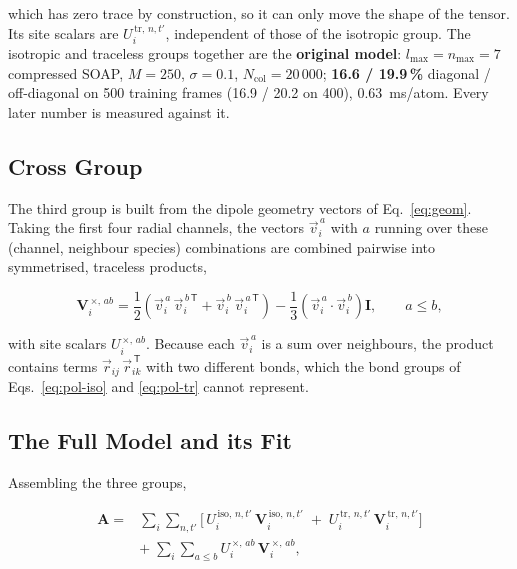 \documentclass[11pt,a4paper]{article}
\begin{document}
which has zero trace by construction, so it can only move the shape of the tensor. Its site
scalars are $U_i^{\,\mathrm{tr},\,n,t'}$, independent of those of the isotropic group. The
isotropic and traceless groups together are the \textbf{original model}:
$l_{\max}=n_{\max}=7$ compressed SOAP, $M=250$, $\sigma=0.1$, $N_{\mathrm{col}} = 20\,000$;
\textbf{16.6 / 19.9\,\%} diagonal / off-diagonal on 500 training frames (16.9 / 20.2 on 400),
0.63~ms/atom. Every later number is measured against it.

\subsection{Cross Group}\label{sec:pol-cross}

The third group is built from the dipole geometry vectors of Eq.~\ref{eq:geom}. Taking the first
four radial channels, the vectors $\vec v_i^{\,a}$ with $a$ running over these (channel,
neighbour species) combinations are combined pairwise into symmetrised, traceless products,

\begin{equation}
\mathbf{V}_i^{\,\times,\,ab} = \frac{1}{2}\left(\vec v_i^{\,a}\,\vec v_i^{\,b\,\mathsf{T}} + \vec v_i^{\,b}\,\vec v_i^{\,a\,\mathsf{T}}\right)
- \frac{1}{3}\left(\vec v_i^{\,a}\cdot\vec v_i^{\,b}\right)\mathbf{I},
\qquad a \le b,
\label{eq:pol-cross}
\end{equation}

with site scalars $U_i^{\,\times,\,ab}$. Because each $\vec v_i^{\,a}$ is a sum over neighbours,
the product contains terms $\vec r_{ij}\,\vec r_{ik}^{\,\mathsf{T}}$ with two different bonds, which
the bond groups of Eqs.~\ref{eq:pol-iso} and \ref{eq:pol-tr} cannot represent.

\subsection{The Full Model and its Fit}\label{sec:pol-form}

Assembling the three groups,

\begin{equation}
\begin{array}{rl}
\mathbf{A} = & \displaystyle \sum_i \sum_{n,t'} \Big[\, U_i^{\,\mathrm{iso},\,n,t'}\, \mathbf{V}_i^{\,\mathrm{iso},\,n,t'}
\;+\; U_i^{\,\mathrm{tr},\,n,t'}\, \mathbf{V}_i^{\,\mathrm{tr},\,n,t'} \Big] \\[2ex]
 & \displaystyle +\; \sum_i \sum_{a \le b} U_i^{\,\times,\,ab}\, \mathbf{V}_i^{\,\times,\,ab} ,
\end{array}
\label{eq:pol-form}
\end{equation}
\end{document}
